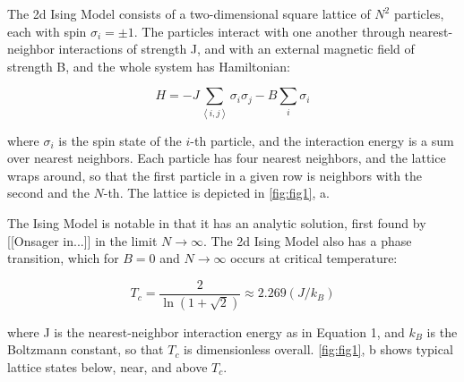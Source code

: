 \documentclass[letter,scriptaddress,twocolumn, prl]{revtex4}
\begin{document}
The 2d Ising Model consists of a two-dimensional square lattice of $N^2$ particles, each with spin $\sigma_i = \pm1$. The particles interact with one another through nearest-neighbor interactions of strength J, and with an external magnetic field of strength B, and the whole system has Hamiltonian:

\begin{equation}
	\label{eq:hamiltonian}
	H = -J \sum_{\left\langle i, j \right\rangle}\sigma_i\sigma_j - B \sum_i\sigma_i
\end{equation}

where $\sigma_i$ is the spin state of the $i$-th particle, and the interaction energy is a sum over nearest neighbors. Each particle has four nearest neighbors, and the lattice wraps around, so that the first particle in a given row is neighbors with the second and the $N$-th. The lattice is depicted in \autoref{fig:fig1}, a.

The Ising Model is notable in that it has an analytic solution, first found by [[Onsager in...]] in the limit $N\rightarrow\infty$. The 2d Ising Model also has a phase transition, which for $B = 0$ and $N\rightarrow\infty$ occurs at critical temperature:

\begin{equation}
	\label{eq:Tc}
	T_c = \frac{2}{\ln{(1+\sqrt{2})}} \approx 2.269 (J/k_B)
\end{equation}

where J is the nearest-neighbor interaction energy as in Equation 1, and $k_B$ is the Boltzmann constant, so that $T_c$ is dimensionless overall. \autoref{fig:fig1}, b shows typical lattice states below, near, and above $T_c$.
\end{document}
